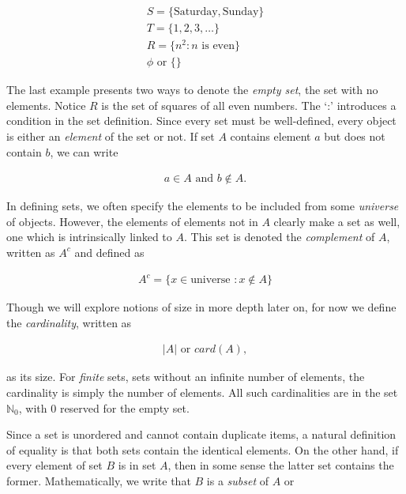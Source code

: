 \documentclass{report}
\begin{document}
\begin{align*}
	S = \{\text{Saturday}, \text{Sunday}\} \\
	T = \{1, 2, 3, \dots \} \\
	R = \{n^2 : n \text{ is even} \} \\
	\phi \text{ or } \{ \}
\end{align*}

The last example presents two ways to denote the \emph{empty set},  the set with no elements. Notice $R$ is the set of squares of all even numbers. The `:' introduces a condition in the set definition. Since every set must be well-defined, every object is either an \emph{element}  of the set or not. If set $A$ contains element $a$ but does not contain $b$, we can write

\begin{align*}
	a \in A \text{ and } b \notin A.
\end{align*}

In defining sets, we often specify the elements to be included from some \emph{universe}  of objects. However, the elements of elements not in $A$ clearly make a set as well, one which is intrinsically linked to $A$. This set is denoted the \emph{complement}  of $A$, written as $A^c$ and defined as

\begin{align*}
	A^c = \{ x \in \text{universe } : x \notin A \}
\end{align*}

Though we will explore notions of size in more depth later on, for now we define the \emph{cardinality},  written as 

\begin{align*}
	|A| \text{ or } card(A),
\end{align*}

as its size. For \emph{finite}  sets, sets without an infinite number of elements, the cardinality is simply the number of elements. All such cardinalities are in the set $\mathbb{N}_0$, with 0 reserved for the empty set.

Since a set is unordered and cannot contain duplicate items, a natural definition of equality is that both sets contain the identical elements. On the other hand, if every element of set $B$ is in set $A$, then in some sense the latter set contains the former. Mathematically, we write that $B$ is a \emph{subset}  of $A$ or
\end{document}
